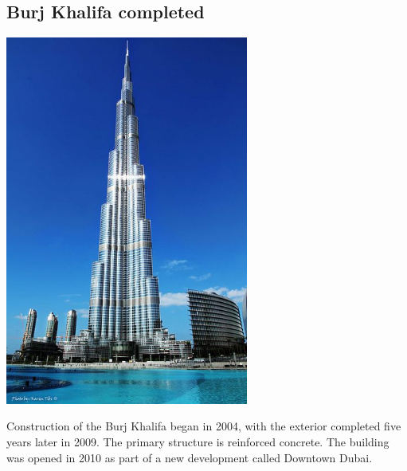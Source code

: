 \documentclass[11pt]{report}
\begin{document}
\subsection{Burj Khalifa completed}
\vspace{2mm}\begin{center}\includegraphics[width=8cm]{./img/burjKhalifa.jpg}\end{center}
Construction of the Burj Khalifa began in 2004, with the exterior completed five years later in 2009. The primary structure is reinforced concrete. The building was opened in 2010 as part of a new development called Downtown Dubai.
\end{document}
